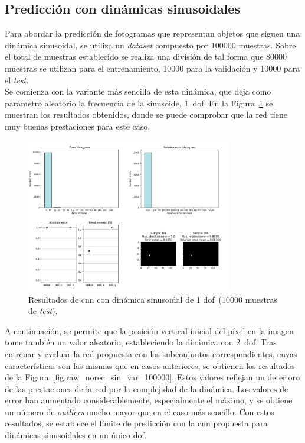 \subsection{Predicción con dinámicas sinusoidales}
Para abordar la predicción de fotogramas que representan objetos que siguen una dinámica sinusoidal, se utiliza un \textit{dataset} compuesto por 100000 muestras. Sobre el total de muestras establecido se realiza una división de tal forma que 80000 muestras se utilizan para el entrenamiento, 10000 para la validación y 10000 para el \textit{test}.\\

Se comienza con la variante más sencilla de esta dinámica, que deja como parámetro aleatorio la frecuencia de la sinusoide, 1~\acrshort{dof}. En la Figura~\ref{fig.raw_norec_sin_fix_100000} se muestran los resultados obtenidos, donde se puede comprobar que la red tiene muy buenas prestaciones para este caso.
\begin{figure}[H]
		\begin{center}
			\includegraphics[width=0.8\textwidth]{ figures/test_raw/NOREC/sin_fix_100000.png}
			\caption{Resultados de \acrshort{cnn} con dinámica sinusoidal de 1 \acrshort{dof}~(10000 muestras de \textit{test}).}
			\label{fig.raw_norec_sin_fix_100000}
		\end{center}
\end{figure}
\vspace{-10pt}

A continuación, se permite que la posición vertical inicial del píxel en la imagen tome también un valor aleatorio, estableciendo la dinámica con 2~\acrshort{dof}. Tras entrenar y evaluar la red propuesta con los subconjuntos correspondientes, cuyas características son las mismas que en casos anteriores, se obtienen los resultados de la Figura~\ref{fig.raw_norec_sin_var_100000}. Estos valores reflejan un deterioro de las prestaciones de la red por la complejidad de la dinámica. Los valores de error han aumentado considerablemente, especialmente el máximo, y se obtiene un número de \textit{outliers} mucho mayor que en el caso más sencillo. Con estos resultados, se establece el límite de predicción con la \acrshort{cnn} propuesta para dinámicas sinusoidales en un único \acrshort{dof}.

